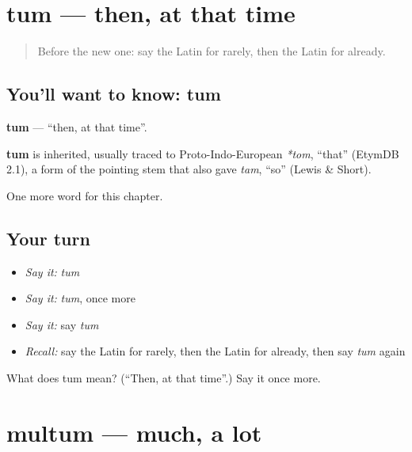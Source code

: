 \section[tum]{tum — then, at that time}

\label{lesson:LA-C105-tum}



\begin{quote}
Before the new one: say the Latin for rarely, then the Latin for already.
\end{quote}

\subsection*{You'll want to know: tum}
\textbf{tum} — \textquotedblleft{}then, at that time\textquotedblright{}.

\begin{cousinweb}
\textbf{tum} is inherited, usually traced to Proto-Indo-European \emph{*tom}, \textquotedblleft{}that\textquotedblright{} (EtymDB 2.1), a form of the pointing stem that also gave \emph{tam}, \textquotedblleft{}so\textquotedblright{} (Lewis \& Short).
\end{cousinweb}

\begin{grammarlens}[title={What you've built}]
One more word for this chapter.
\end{grammarlens}

\subsection*{Your turn}
\begin{itemize}
\raggedright
  \item \emph{Say it:} \emph{tum}
  \item \emph{Say it:} \emph{tum}, once more
  \item \emph{Say it:} say \emph{tum}
  \item \emph{Recall:} say the Latin for rarely, then the Latin for already, then say \emph{tum} again
\end{itemize}

\begin{tcolorbox}[breakable,colback=teal!4,colframe=teal!35!black,title={Before you move on}]
What does tum mean? (\textquotedblleft{}Then, at that time\textquotedblright{}.) Say it once more.
\end{tcolorbox}
\section[multum]{multum — much, a lot}

